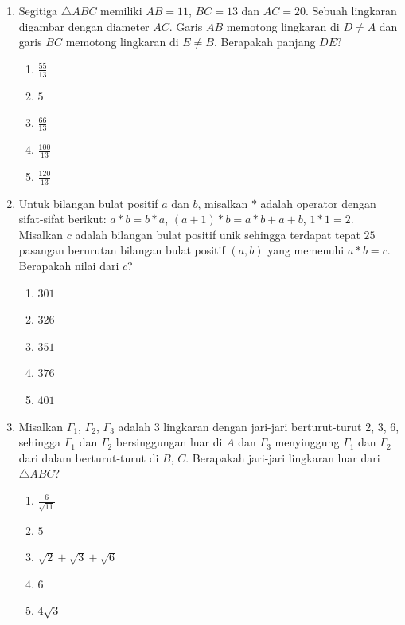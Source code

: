\documentclass[12pt]{scrartcl}
\begin{document}
\begin{enumerate}
\item Segitiga $\triangle ABC$ memiliki $AB=11$, $BC=13$ dan $AC=20$. Sebuah lingkaran digambar dengan diameter $AC$. Garis $AB$ memotong lingkaran di $D\ne A$ dan garis $BC$ memotong lingkaran di $E\ne B$. Berapakah panjang $DE$?
\begin{enumerate}
    \item $\frac{55}{13}$
    \item $5$
    \item $\frac{66}{13}$
    \item $\frac{100}{13}$
    \item $\frac{120}{13}$
\end{enumerate}

\item Untuk bilangan bulat positif $a$ dan $b$, misalkan $*$ adalah operator dengan sifat-sifat berikut: $a*b=b*a$, $(a+1)*b=a*b+a+b$, $1*1=2$. Misalkan $c$ adalah bilangan bulat positif unik sehingga terdapat tepat $25$ pasangan berurutan bilangan bulat positif $(a, b)$ yang memenuhi $a*b=c$. Berapakah nilai dari $c$?
\begin{enumerate}
    \item $301$
    \item $326$
    \item $351$
    \item $376$
    \item $401$
\end{enumerate}

\item Misalkan $\Gamma_{1}$, $\Gamma_{2}$, $\Gamma_{3}$ adalah $3$ lingkaran dengan jari-jari berturut-turut $2$, $3$, $6$, sehingga $\Gamma_{1}$ dan $\Gamma_{2}$ bersinggungan luar di $A$ dan $\Gamma_{3}$ menyinggung $\Gamma_{1}$ dan $\Gamma_{2}$ dari dalam berturut-turut di $B$, $C$. Berapakah jari-jari lingkaran luar dari $\triangle ABC$?
\begin{enumerate}
    \item $\frac{6}{\sqrt{11}}$
    \item $5$
    \item $\sqrt{2}+\sqrt{3}+\sqrt{6}$
    \item $6$
    \item $4\sqrt{3}$
\end{enumerate}


\end{enumerate}
\end{document}
